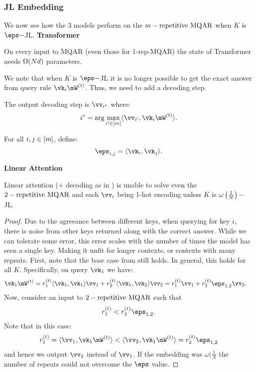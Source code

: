 \subsubsection{JL Embedding}
We now see how the 3 models perform on the $m-\text{repetitive MQAR}$ when $K$ is $\eps-$JL.
\textbf{Transformer}
\begin{lemma}
On every input to MQAR (even those for 1-rep-MQAR) the state of Transformer needs $\Omega(Nd)$ parameters.
\end{lemma}
We note that when $K$ is $\eps-$JL it is no longer possible to get the exact answer from query rule $\vk_{i}\mW^{(\timestep)}$. Thus, we need to add a decoding step.
\begin{definition}\label{def:Decode}
The output decoding step is $\vv_{i^{*}}$ where:
\[i^{*} = \arg\max_{i'\in[\numPairs]}\langle\vv_{i'}, \vk_{i}\mW^{(\timestep)}\rangle.\]
\end{definition}
\begin{definition} For all $i,j\in [m]$, define:
\[ \error{i}{j} = \langle \vk_{i}, \vk_{j} \rangle. \]
\end{definition}
\textbf{Linear Attention}
\begin{theorem}
Linear attention (+ decoding as in ) is unable to solve even the $2-\text{repetitive MQAR}$ and each $\vv_{i}$ being 1-hot encoding unless $K$ is $\omega\left(\frac{1}{N}\right)-$JL.
\end{theorem}
\begin{proof}
    Due to the agreeance between different keys, when querying for key $i$, there is noise from other keys returned along with the correct answer. While we can tolerate some error, this error scales with the number of times the model has seen a single key. Making it unfit for longer contexts, or contexts with many repeats.
    First, note that the base case  from  still holds. In general, this holds for all $K$.
    Specifically, on query $\vk_{1}$ we have:
    \begin{align*}
        \vk_{1}\mW^{(\timestep)}=r_{1}^{(\timestep)}\langle\vk_{1},\vk_{1}\rangle\vv_{1} + r_{2}^{(\timestep)}\langle\vk_{1},\vk_{2}\rangle\vv_{2}
        &= r_{1}^{(\timestep)}\vv_{1}+r_{2}^{(\timestep)}\error{1}{2}\vv_{2}.
    \end{align*}
    Now, consider an input to $2-\text{repetitive MQAR}$ such that
    \[r_{1}^{(\timestep)}<r_{2}^{(\timestep)}\error{1}{2}.\] Note that in this case:
    \[r_{1}^{(\timestep)}= \langle \vv_{1}, \vk_{1}\mW^{(\timestep)}\rangle < \langle \vv_{2}, \vk_{1}\mW^{(\timestep)}\rangle = r_{2}^{(\timestep)}\eps_{1,2}\]
    and hence we output $\vv_{2}$ instead of $\vv_{1}$.
    If the embedding was $\omega(\frac{1}{N}$ the number of repeats could not overcome the $\eps$ value.
\end{proof}
